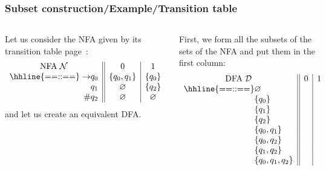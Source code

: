 %
\begin{frame}
\frametitle{Subset construction/Example/Transition table}

\begin{columns}

   Let us consider the NFA given by its
  transition table page~\pageref{nfa_01_suffix_table}:
  \[
  \begin{array}{r@{}l||c|c}
    \multicolumn{2}{c||}{\text{NFA} \; {\cal N}} & 0 & 1\\
    \hhline{==::==}
    \rightarrow & q_0 & \{q_0, q_1\} & \{q_0\}\\
    & q_1 & \varnothing  & \{q_2\}\\
    \#          & q_2 & \varnothing  & \varnothing
  \end{array}
  \]
  and let us create an equivalent DFA.

   First, we form all the subsets of the sets of
  the NFA and put them in the first column:
  \[
  \begin{array}{r@{}l||c|c}
    \multicolumn{2}{c||}{\text{DFA} \; {\cal D}} & 0 & 1\\
    \hhline{==::==}
    & \varnothing & &\\
    & \{q_0\}           & &\\
    & \{q_1\}           & &\\
    & \{q_2\}           & &\\
    & \{q_0, q_1\}      & &\\
    & \{q_0, q_2\}      & &\\
    & \{q_1, q_2\}      & &\\
    & \{q_0, q_1, q_2\} & &
  \end{array}
  \]
\end{columns}

\end{frame}


